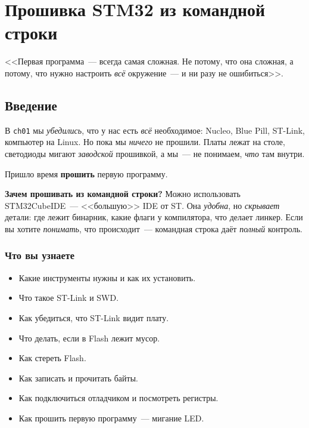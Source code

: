
\chapter{Прошивка STM32 из командной строки}
\label{ch:flashing}

\epigraph{<<Первая программа~--- всегда самая сложная.
Не потому, что она сложная, а потому, что нужно
настроить \emph{всё} окружение~--- и ни разу не
ошибиться>>.}{}

\section{Введение}
\label{sec:flashing-intro}

В \texttt{ch01} мы \emph{убедились}, что у нас есть
\emph{всё} необходимое: Nucleo, Blue Pill, ST-Link,
компьютер на Linux. Но пока мы \emph{ничего} не
прошили. Платы лежат на столе, светодиоды мигают
\emph{заводской} прошивкой, а мы~--- не понимаем,
\emph{что} там внутри.

Пришло время \textbf{прошить} первую программу.

\begin{ideabox}
\textbf{Зачем прошивать из командной строки?} Можно
использовать STM32CubeIDE~--- <<большую>> IDE от ST.
Она \emph{удобна}, но \emph{скрывает} детали: где
лежит бинарник, какие флаги у компилятора, что делает
линкер. Если вы хотите \emph{понимать}, что происходит~---
командная строка даёт \emph{полный} контроль.
\end{ideabox}

\subsection{Что вы узнаете}

\begin{itemize}
    \item Какие инструменты нужны и как их установить.
    \item Что такое ST-Link и SWD.
    \item Как убедиться, что ST-Link видит плату.
    \item Что делать, если в Flash лежит мусор.
    \item Как стереть Flash.
    \item Как записать и прочитать байты.
    \item Как подключиться отладчиком и посмотреть регистры.
    \item Как прошить первую программу~--- мигание LED.
\end{itemize}

